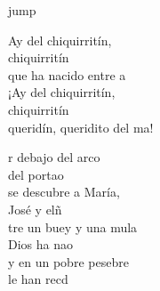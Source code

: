\begin{cancion}[Chiquirritín][]jump\\
	\begin{chorus}%
		Ay del chiquirritín,\\
	\jump
	chiquirritín\\
		que ha nacido entre a \\
	\jump
	¡Ay del chiquirritín, \\
	\jump
	chiquirritín\\
		queridín, queridito del ma!\jump\\
	\end{chorus}%
	r debajo del arco \\
	del portao \\
	\jump
se descubre a María, \\
	José y elñ\\
	\jump
	tre un buey y una mula\\
	Dios ha nao \\
	\jump
y en un pobre pesebre \\
	le han recd \\
\end{cancion}%
